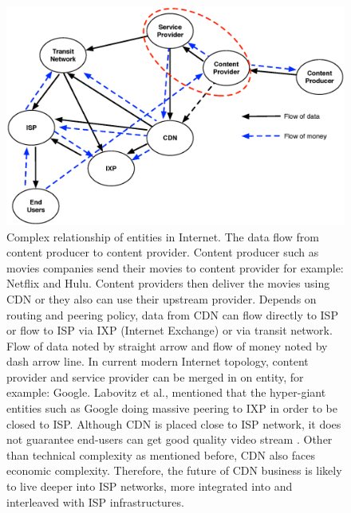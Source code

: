 \documentclass[JIP]{ipsj}
\begin{document}
\begin{figure}[tb]
\begin{center}
\includegraphics[scale=0.4]{graphs/business-relationship.eps}
\end{center}
\caption{Complex relationship of entities in Internet.
The data flow from content producer to content provider. 
Content producer such as movies companies send their movies to content provider for example: Netflix and Hulu.
Content providers then deliver the movies using CDN or they also can use their upstream provider.
Depends on routing and peering policy, data from CDN can flow directly to ISP or flow to ISP via IXP (Internet Exchange) or via transit network. 
Flow of data noted by straight arrow and flow of money noted by dash arrow line.
In current modern Internet topology, content provider and service provider can be merged in on entity, for example: Google.
Labovitz et al.,\cite{Labovitz:2010:IIT:2043164.1851194} mentioned that the hyper-giant entities such as Google doing massive peering to IXP in order to be closed to ISP. 
Although CDN is placed close to ISP network, it does not guarantee end-users can get good quality video stream \cite{Krishnan:2009:MBE:1644893.1644917}.
Other than technical complexity as mentioned before, CDN also faces economic complexity\cite{dispute}.
Therefore, the future of CDN business is likely to live deeper into ISP networks, more integrated into and interleaved with ISP infrastructures.}
\label{fig:businessrelationship}
\vspace{-2mm}
\end{figure} 

\end{document}
